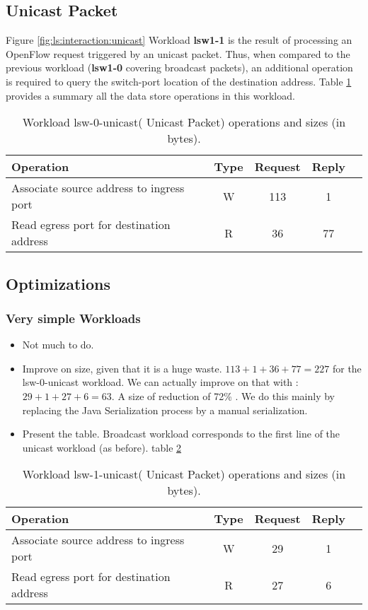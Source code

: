 \subsection{Unicast Packet}
Figure                \ref{fig:ls:interaction:unicast}
Workload \textbf{lsw1-1} is the result of processing an OpenFlow request
triggered by an unicast packet. Thus,  when compared to the previous
workload (\textbf{lsw1-0} covering broadcast packets), an additional
operation is required to query the switch-port location of the
destination address. Table \ref{table:lsw0:unicast} provides a summary all the data
store operations in this workload. 

\begin{table}[ht]
\centering 
\begin{tabular}{l c c c c}
 Operation & Type & Request & Reply  \\ \toprule 
 Associate source address to ingress port & W & 113 & 1\\\midrule
Read egress port for destination address & R & 36 & 77 \\\bottomrule
\end{tabular}
\caption[Workload lsw-0-unicast( Unicast Packet) operations]{Workload lsw-0-unicast( Unicast Packet) operations and sizes (in bytes).}
\label{table:lsw0:unicast}
\end{table}

\subsection{Optimizations}


\subsubsection{Very simple Workloads}
\begin{itemize} 
\item Not much to do. 
\item Improve on size, given that it is a huge waste. $113 +1 + 36+
  77 = 227$  for the lsw-0-unicast workload. We can actually improve
 on that with : $29 +1 + 27 + 6 = 63$. A size of reduction of 
 72\% . We do this mainly by replacing
 the Java Serialization process by a manual serialization. 
\item  Present the table. Broadcast workload corresponds to the first
  line of the unicast workload (as before).  table \ref{table:lsw1:unicast}
\end{itemize}

\begin{table}[ht]
\centering 
\begin{tabular}{l c c c c}
 Operation & Type & Request & Reply \\ \toprule 
Associate source address to ingress port & W & 29 & 1\\\midrule
Read egress port for destination address & R & 27 & 6 \\\bottomrule
\end{tabular}
\caption[Workload lsw-1-unicast( Unicast Packet) operations]{Workload lsw-1-unicast( Unicast Packet) operations and sizes (in bytes).}
\label{table:lsw1:unicast}
\end{table}

